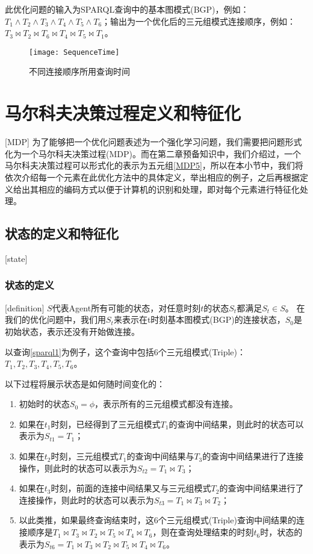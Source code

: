 此优化问题的输入为SPARQL查询中的基本图模式(BGP)，例如：$T_1\wedge T_2\wedge T_3\wedge T_4\wedge T_5\wedge T_6$；输出为一个优化后的三元组模式连接顺序，例如：$T_3 \Join T_2 \Join T_6 \Join T_4 \Join T_5 \Join T_1$。
\begin{figure}[h]
    \centering
    \texttt{[image: SequenceTime]}
    \caption{不同连接顺序所用查询时间}
    \label{SequenceTime}
\end{figure}

\section{马尔科夫决策过程定义和特征化}[MDP]
为了能够把一个优化问题表述为一个强化学习问题，我们需要把问题形式化为一个马尔科夫决策过程(MDP)。而在第二章预备知识中，我们介绍过，一个马尔科夫决策过程可以形式化的表示为五元组\ref{MDP5}，所以在本小节中，我们将依次介绍每一个元素在此优化方法中的具体定义，举出相应的例子，之后再根据定义给出其相应的编码方式以便于计算机的识别和处理，即对每个元素进行特征化处理。
\subsection{状态的定义和特征化}[state]
\subsubsection{状态的定义}[definition]
$S$代表Agent所有可能的状态，对任意时刻$t$的状态$S_t$都满足$S_t \in S$。
在我们的优化问题中，我们用$S_t$来表示在t时刻基本图模式(BGP)的连接状态，$S_0$是初始状态，表示还没有开始做连接。

以查询\ref{sparql1}为例子，这个查询中包括6个三元组模式(Triple)：$T_1, T_2, T_3, T_4, T_5, T_6$。

以下过程将展示状态是如何随时间变化的：
\begin{enumerate}
    \item 初始时的状态$S_0=\phi$，表示所有的三元组模式都没有连接。
    \item 如果在$t_1$时刻，已经得到了三元组模式$T_1$的查询中间结果，则此时的状态可以表示为$S_{t1} = T_1$； 
    \item 如果在$t_2$时刻，三元组模式$T_1$的查询中间结果与$T_3$的查询中间结果进行了连接操作，则此时的状态可以表示为$S_{t2} = T_1 \Join T_3$；
    \item 如果在$t_3$时刻，前面的连接中间结果又与三元组模式$T_2$的查询中间结果进行了连接操作，则此时的状态可以表示为$S_{t3} = T_1 \Join T_3 \Join T_2$；
    \item 以此类推，如果最终查询结束时，这6个三元组模式(Triple)查询中间结果的连接顺序是$T_1 \Join T_3 \Join T_2 \Join T_5 \Join T_4 \Join T_6$，则在查询处理结束的时刻$t_6$时，状态的表示为$S_{t6} = T_1 \Join T_3 \Join T_2 \Join T_5 \Join T_4 \Join T_6$。
\end{enumerate}

